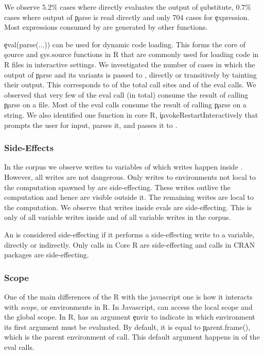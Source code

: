 \documentclass[USenglish,cleveref, autoref, thm-restate]{lipics-v2019}
\begin{document}
We observe 5.2\% cases where \eval directly evaluates the output of
\c{substitute}, 0.7\% cases where output of \c{parse} is read directly and
only 704 cases for \c{expression}. Most expressions consumed by \eval are
generated by other functions.

\c{eval(parse(...))} can be used for dynamic code loading. This forms the
core of \c{source} and \c{sys.source} functions in R that are commonly used
for loading code in R files in interactive settings. We investigated the
number of cases in which the output of \c{parse} and its variants is passed
to \eval, directly or transitively by tainting their output. This
corresponds to \PercentParsedCallSites of the total \eval call sites and
\PercentParsedEvals of the eval calls. We observed that very few of the eval
call (\NbParseFilesRnd in total) consume the result of calling \c{parse} on
a file. Most of the eval calls consume the result of calling \c{parse} on a
string.  We also identified one function in core R,
\c{invokeRestartInteractively} that prompts the user for input, parses it,
and passes it to \eval.

\subsubsection{Side-Effects}

In the corpus we observe \AllWritesRnd writes to variables of which
\EvalWritesRnd writes happen inside \eval. However, all writes are not
dangerous. Only writes to environments not local to the computation spawned
by \eval are side-effecting. These writes outlive the computation and hence
are visible outside it. The remaining writes are local to the
computation. We observe that \EvalSideEffectingWritesRnd writes inside evals
are side-effecting. This is only \EvalSideEffectingWritesEvalPerc of all
variable writes inside \eval and \EvalSideEffectingWritesAllPerc of all
variable writes in the corpus.

An \eval is considered side-effecting if it performs a side-effecting write to a
variable, directly or indirectly. Only \SideEffectingCoreCallPerc \eval calls in
Core R are side-effecting and \SideEffectingPackageCallPerc \eval calls in CRAN
packages are side-effecting.

\subsubsection{Scope}

One of the main differences of the R \eval with the javascript one is how it
interacts with \emph{scope}, or environments in R. In Javascript, \eval can
access the local scope and the global scope. In R, \eval has an argument
\c{envir} to indicate in which environment its first argument must be evaluated.
By default, it is equal to \c{parent.frame()}, 
which is the parent environment of \eval call. This default argument
happens in \DefaultEnvirExprPercent of the eval calls.
\end{document}
